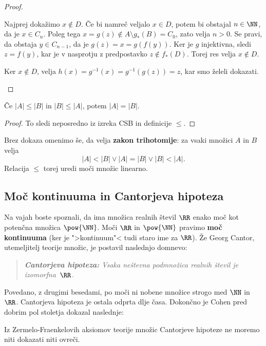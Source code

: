 \begin{proof}
\begin{enumerate}
    Najprej dokažimo $x \not\in D$. Če bi namreč veljalo $x \in D$, potem bi
    obstajal $n \in \NN$, da je $x \in C_n$. Poleg tega
    $x = g(z) \not\in A \setminus g_{*}(B) = C_0$, zato velja $n > 0$. Se pravi,
    da obstaja $y \in C_{n-1}$, da je $g(z) = x = g(f(y))$. Ker je $g$
    injektivna, sledi $z = f(y)$, kar je v nasprotju z predpostavko
    $z \not\in f_{*}(D)$. Torej res velja $x \not\in D$.

    Ker $x \not\in D$, velja $h(x) = g^{-1}(x) = g^{-1}(g(z)) = z$, kar smo
    želeli dokazati.
  \end{enumerate}
\end{proof}

\begin{posledica}
  Če $|A| \leq |B|$ in $|B| \leq |A|$, potem $|A| = |B|$.
\end{posledica}

\begin{proof}
  To sledi neposredno iz izreka CSB in definicije $\leq$.
\end{proof}

Brez dokaza omenimo še, da velja \textbf{zakon trihotomije}: za vsaki množici $A$ in $B$
velja
%
\begin{equation*}
  |A| < |B| \lor |A| = |B| \lor |B| < |A|.
\end{equation*}
%
Relacija $\leq$ torej uredi moči množic linearno.



\subsection{Moč kontinuuma in Cantorjeva hipoteza}

Na vajah boste spoznali, da ima množica realnih števil $\RR$ enako moč kot potenčna množica $\pow{\NN}$. Moči $\RR$ in $\pow{\NN}$ pravimo \textbf{moč kontinuuma} (ker je ">kontinuum"< tudi staro ime za $\RR$). Že Georg Cantor, utemeljitelj teorije množic, je postavil naslednjo domnevo:
%
\begin{quote}
  \emph{\textbf{Cantorjeva hipoteza:} Vsaka neštevna podmnožica realnih števil je izomorfna~$\RR$.}
\end{quote}
%
Povedano, z drugimi besedami, po moči ni nobene množice strogo med $\NN$ in $\RR$. Cantorjeva hipoteza je ostala odprta dlje časa. Dokončno je Cohen pred dobrim pol stoletja dokazal naslednje:

\begin{izrek}[Cohen]
  Iz Zermelo-Fraenkelovih aksiomov teorije množic Cantorjeve hipoteze ne moremo niti dokazati niti ovreči.
\end{izrek}

